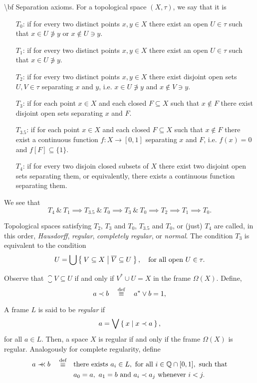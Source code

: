 \num {\bf Separation axioms.} For a topological space $(X,\tau)$, we say that it is
\begin{itemize}
    \item[$T_0$:] if for every two distinct points $x,y\in X$ there exist an open $U\in \tau$ such that $x\in U\not\ni y$ or $x\not\in U\ni y$.
    \item[$T_1$:] if for every two distinct points $x,y\in X$ there exist an open $U\in \tau$ such that $x\in U\not\ni y$.
    \item[$T_2$:] if for every two distinct points $x,y\in X$ there exist disjoint open sets $U,V\in \tau$ separating $x$ and $y$, i.e. $x\in U\not\ni y$ and $x\not\in V\ni y$.
    \item[$T_3$:] if for each point $x\in X$ and each closed $F\subseteq X$ such that $x\notin F$ there exist disjoint open sets separating $x$ and $F$.
    \item[$T_{3.5}$:] if for each point $x\in X$ and each closed $F\subseteq X$ such that $x\notin F$ there exist a continuous function $f\colon X\to [0,1]$ separating $x$ and $F$, i.e. $f(x) = 0$ and $f[F]\subseteq \{1\}$.
    \item[$T_{4}$:] if for every two disjoin closed subsets of $X$ there exist two disjoint open sets separating them, or equivalently, there exists a continuous function separating them.
\end{itemize}

We see that
$$ T_4~\&~T_1 \implies T_{3.5}~\&~T_0 \implies T_3~\&~T_0 \implies T_2 \implies T_1 \implies T_0. $$

\noindent Topological spaces satisfying $T_2$, $T_3$ and $T_0$, $T_{3.5}$ and $T_0$, or (just) $T_4$ are called, in this order, \emph{Hausdorff}, \emph{regular}, \emph{completely regular}, or \emph{normal}.
The condition $T_3$ is equivalent to the condition
$$U = \bigcup \Set{ V\subseteq X | \overline{V} \subseteq U},\quad\text{for all open } U\in \tau.$$

Observe that $\closure V\subseteq U$ if and only if $V^*\cup U = X$ in the frame $\Omega(X)$. Define,
$$ a\prec b\quad\stackrel{\text{def}}{\equiv}\quad a^*\vee b = 1,$$

\noindent A frame $L$ is said to be \emph{regular} if
$$ a = \bigvee \Set{ x | x\prec a},$$
\noindent for all $a\in L$. Then, a space $X$ is regular if and only if the frame $\Omega(X)$ is regular.
Analogously for complete regularity, define
\begin{align*}
    a\prec\mkern-8mu\prec b\quad\stackrel{\text{def}}{\equiv}\quad &\text{there exists } a_i\in L,\text{ for all } i\in \mathbb Q\cap [0,1],\text{ such that}\\
        & a_0 = a,~ a_1 = b\text{ and } a_i\prec a_j\text{ whenever } i<j.
\end{align*}


